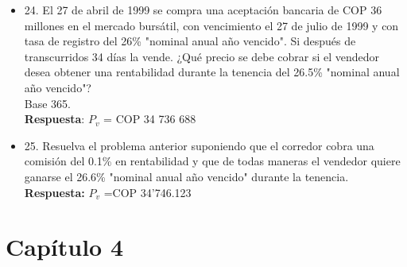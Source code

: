 \begin{itemize}
 \item 24. El 27 de abril de 1999 se compra una aceptación bancaria de COP 36 millones en el mercado bursátil, con vencimiento el 27 de julio de 1999 y con tasa de registro del 26\% "nominal anual año vencido". Si después de transcurridos 34 días la vende. ¿Qué precio se debe cobrar si el vendedor desea obtener una rentabilidad durante la tenencia del 26.5\% "nominal anual año vencido"?\\
       Base 365.\\
       \textbf{Respuesta}: $P_{v}$ = COP 34 736 688\\
       \medskip

 \item 25. Resuelva el problema anterior suponiendo que el corredor cobra una comisión del 0.1\% en rentabilidad y que de todas maneras el vendedor quiere ganarse el 26.6\% "nominal anual año vencido" durante la tenencia.\\
       \textbf{Respuesta:} $P_{v}$ =COP 34'746.123\\


\end{itemize}



\chapter*{Capítulo 4}


